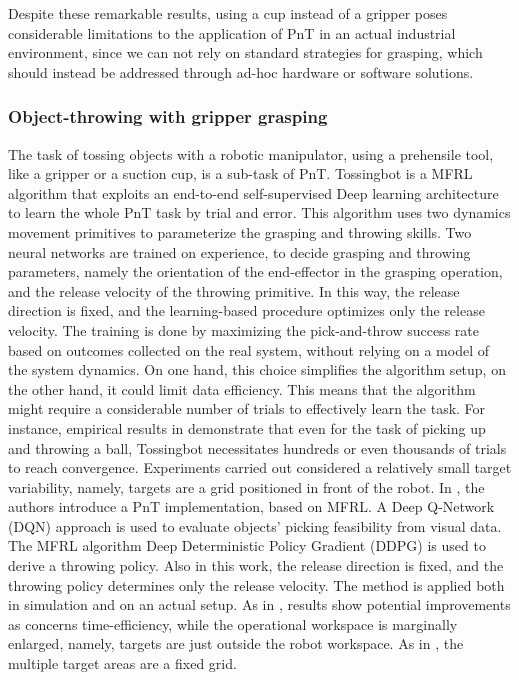 Despite these remarkable results, using a cup instead of a gripper poses considerable limitations to the application of PnT in an actual industrial environment, since we can not rely on standard strategies for grasping, which should instead be addressed through ad-hoc hardware or software solutions.


\subsubsection{Object-throwing with gripper grasping}
The task of tossing objects with a robotic manipulator, using a prehensile tool, like a gripper or a suction cup, is a sub-task of PnT. 
Tossingbot \cite{tossingbot} is a MFRL algorithm that exploits an end-to-end self-supervised Deep learning architecture to learn the whole PnT task by trial and error. 
This algorithm uses two dynamics movement primitives 
\cite{paraschos2013probabilistic_primitives_robotics_jan_peters} to parameterize the grasping and throwing skills. 
Two neural networks are trained on experience, to decide grasping and throwing parameters, namely the orientation of the end-effector in the grasping operation, and the release velocity of the throwing primitive. In this way, the release direction is fixed, and the learning-based procedure optimizes only the release velocity. The training is done by maximizing the pick-and-throw success rate based on outcomes collected on the real system, without relying on a model of the system dynamics. 
On one hand, this choice simplifies the algorithm setup, on the other hand, it could limit data efficiency. This means that the algorithm might require a considerable number of trials to effectively learn the task. For instance, empirical results in \cite{tossingbot} demonstrate that even for the task of picking up and throwing a ball, Tossingbot necessitates hundreds or even thousands of trials to reach convergence. Experiments carried out considered a relatively small target variability, namely, targets are a grid positioned in front of the robot. 
In \cite{pick_and_throw_sorting_deep_rl}, the authors introduce a PnT implementation, based on MFRL. A Deep Q-Network (DQN) \cite{DQN} approach is used to evaluate objects' picking feasibility from visual data. The  MFRL algorithm Deep Deterministic Policy Gradient (DDPG) \cite{DDPG} is used to derive a throwing policy. Also in this work, the release direction is fixed, and the throwing policy determines only the release velocity. The method is applied both in simulation and on an actual setup. As in \cite{urban_waste_throwing}, results show potential improvements as concerns time-efficiency, while the operational workspace is marginally enlarged, namely, targets are just outside the robot workspace. As in \cite{tossingbot}, the multiple target areas are a fixed grid.
